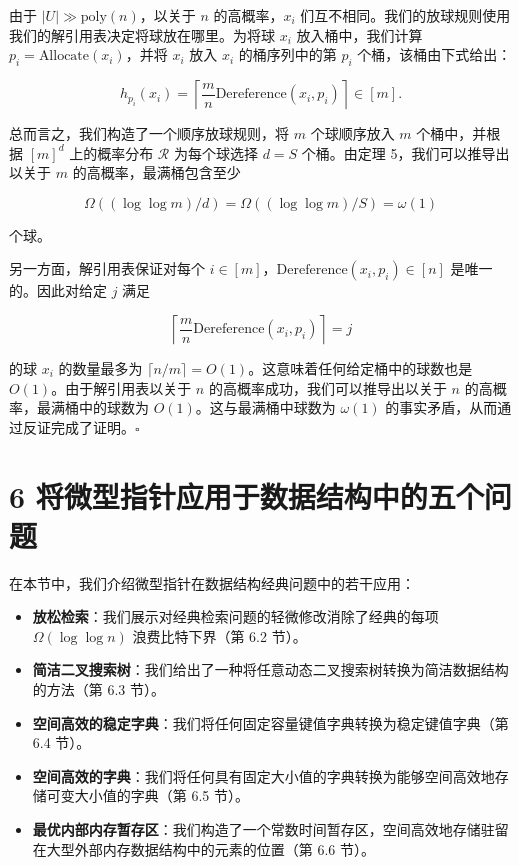 \documentclass[12pt,a4paper]{ctexart}
\theoremstyle{remark}
\begin{document}
由于 $|U|\gg\text{poly}(n)$，以关于 $n$ 的高概率，$x_i$ 们互不相同。我们的放球规则使用我们的解引用表决定将球放在哪里。为将球 $x_i$ 放入桶中，我们计算 $p_i=\text{Allocate}(x_i)$，并将 $x_i$ 放入 $x_i$ 的桶序列中的第 $p_i$ 个桶，该桶由下式给出：

$$h_{p_i}(x_i)=\left\lceil\frac{m}{n}\text{Dereference}(x_i,p_i)\right\rceil\in[m].$$

总而言之，我们构造了一个顺序放球规则，将 $m$ 个球顺序放入 $m$ 个桶中，并根据 $[m]^d$ 上的概率分布 $\mathcal{R}$ 为每个球选择 $d=S$ 个桶。由定理 5，我们可以推导出以关于 $m$ 的高概率，最满桶包含至少

$$\Omega((\log\log m)/d)=\Omega((\log\log m)/S)=\omega(1)$$

个球。

另一方面，解引用表保证对每个 $i\in[m]$，$\text{Dereference}(x_i,p_i)\in[n]$ 是唯一的。因此对给定 $j$ 满足

$$\left\lceil\frac{m}{n}\text{Dereference}(x_i,p_i)\right\rceil=j$$

的球 $x_i$ 的数量最多为 $\lceil n/m\rceil=O(1)$。这意味着任何给定桶中的球数也是 $O(1)$。由于解引用表以关于 $n$ 的高概率成功，我们可以推导出以关于 $n$ 的高概率，最满桶中的球数为 $O(1)$。这与最满桶中球数为 $\omega(1)$ 的事实矛盾，从而通过反证完成了证明。$\square$

\medskip
\section{6 将微型指针应用于数据结构中的五个问题}
在本节中，我们介绍微型指针在数据结构经典问题中的若干应用：

\begin{itemize}
\item \textbf{放松检索}：我们展示对经典检索问题的轻微修改消除了经典的每项 $\Omega(\log\log n)$ 浪费比特下界（第 6.2 节）。
\item \textbf{简洁二叉搜索树}：我们给出了一种将任意动态二叉搜索树转换为简洁数据结构的方法（第 6.3 节）。
\item \textbf{空间高效的稳定字典}：我们将任何固定容量键值字典转换为稳定键值字典（第 6.4 节）。
\item \textbf{空间高效的字典}：我们将任何具有固定大小值的字典转换为能够空间高效地存储可变大小值的字典（第 6.5 节）。
\item \textbf{最优内部内存暂存区}：我们构造了一个常数时间暂存区，空间高效地存储驻留在大型外部内存数据结构中的元素的位置（第 6.6 节）。
\end{itemize}
\end{document}
